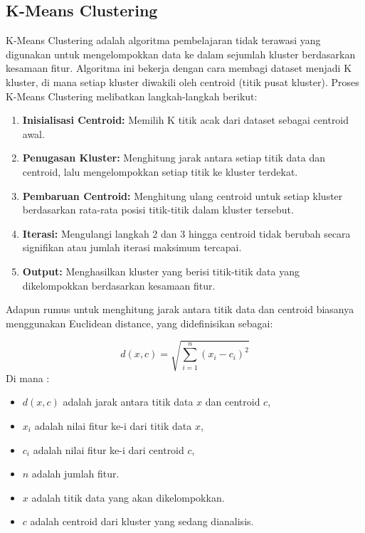 \subsection{K-Means Clustering}
K-Means Clustering adalah algoritma pembelajaran tidak terawasi yang digunakan untuk mengelompokkan data ke dalam sejumlah kluster berdasarkan kesamaan fitur. Algoritma ini bekerja dengan cara membagi dataset menjadi K kluster, di mana setiap kluster diwakili oleh centroid (titik pusat kluster). 
Proses K-Means Clustering melibatkan langkah-langkah berikut:
\begin{enumerate}
    \item \textbf{Inisialisasi Centroid:} Memilih K titik acak dari dataset sebagai centroid awal.
    \item \textbf{Penugasan Kluster:} Menghitung jarak antara setiap titik data dan centroid, lalu mengelompokkan setiap titik ke kluster terdekat.
    \item \textbf{Pembaruan Centroid:} Menghitung ulang centroid untuk setiap kluster berdasarkan rata-rata posisi titik-titik dalam kluster tersebut.
    \item \textbf{Iterasi:} Mengulangi langkah 2 dan 3 hingga centroid tidak berubah secara signifikan atau jumlah iterasi maksimum tercapai.
    \item \textbf{Output:} Menghasilkan kluster yang berisi titik-titik data yang dikelompokkan berdasarkan kesamaan fitur.
\end{enumerate}

Adapun rumus untuk menghitung jarak antara titik data dan centroid biasanya menggunakan Euclidean distance, yang didefinisikan sebagai:

\begin{equation}
    d(x, c) = \sqrt{\sum_{i=1}^{n} (x_i - c_i)^2}
\end{equation}
Di mana :
\begin{itemize}
    \item \(d(x, c)\) adalah jarak antara titik data \(x\) dan centroid \(c\),
    \item \(x_i\) adalah nilai fitur ke-i dari titik data \(x\),
    \item \(c_i\) adalah nilai fitur ke-i dari centroid \(c\),
    \item \(n\) adalah jumlah fitur.
    \item \(x\) adalah titik data yang akan dikelompokkan.
    \item \(c\) adalah centroid dari kluster yang sedang dianalisis.
\end{itemize}

